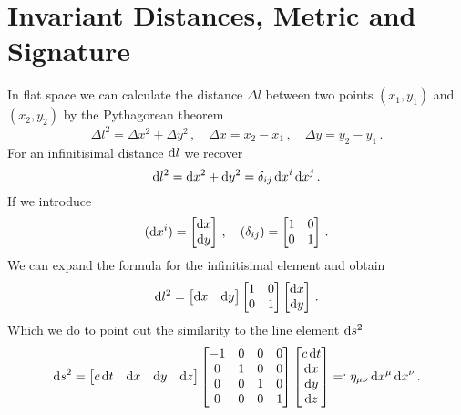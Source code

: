 \section{Invariant Distances, Metric and Signature}
In flat space we can calculate the distance $\Delta l$ between two points
$(x_1,y_1)$ and $(x_2,y_2)$ by the Pythagorean theorem
\begin{equation}
\Delta l^2=\Delta x^2+\Delta y^2\, ,
\quad \Delta x=x_2-x_1\,,\quad \Delta
y=y_2-y_1\, .
\end{equation}
For an infinitisimal distance $\dif l$ we recover
\begin{equation}
\dif l^2=\dif x^2+\dif y^2=\delta_{ij}\dif x^i\dif x^j\, .
\end{equation}
If we introduce
\begin{equation}
(\dif x^i)=\begin{bmatrix}
\dif x\\
\dif y
\end{bmatrix}\,,\quad (\delta_{ij})
=\begin{bmatrix}
1 & 0\\
0 & 1
\end{bmatrix}\, .
\end{equation}
We can expand the formula for the infinitisimal element and obtain
\begin{equation}
\dif l^2=\begin{bmatrix}
\dif x & 
\dif y
\end{bmatrix}
\begin{bmatrix}
1 & 0\\
0 & 1
\end{bmatrix}
\begin{bmatrix}
\dif x\\
\dif y
\end{bmatrix}\, .
\end{equation}
Which we do to point out the similarity to the line element $\dif s^2$
\begin{equation}
\dif s^2=\begin{bmatrix}
c\dif t & 
\dif x & 
\dif y &
\dif z 
\end{bmatrix}
\begin{bmatrix}
-1 & 0 & 0 & 0\\
0  & 1 & 0 & 0\\
0  & 0 & 1 & 0\\
0  & 0 & 0 & 1\\
\end{bmatrix}
\begin{bmatrix}
c\dif t\\
\dif x\\
\dif y\\
\dif z\\
\end{bmatrix}=:\eta_{\mu\nu}\dif x^\mu\dif x^\nu\, .
\end{equation}

